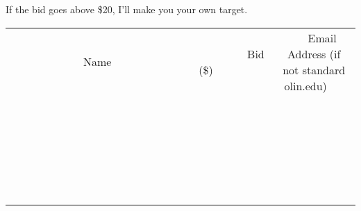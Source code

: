\documentclass[11pt]{article}
\begin{document}
If the bid goes above \$20, I'll make you your own target.
\\[6ex]
\begin{tabular}{c c c}
~~~~~~~~~~~~~Name~~~~~~~~~~~~~ & ~~~~~~~~~Bid (\$)~~~~~~~~~  & ~~~Email Address (if not standard olin.edu)~~~\\
 & & \\
\hline
 & & \\
\hline
 & & \\
\hline
 & & \\
\hline
 & & \\
\hline
 & & \\
\hline
 & & \\
\hline
 & & \\
\hline
 & & \\
\hline
 & & \\
\hline
 & & \\
\hline
 & & \\
\hline
 & & \\
\hline
 & & \\
\hline
 & & \\
\hline
 & & \\
\hline
 & & \\
\hline
 & & \\
\hline
 & & \\
\hline
 & & \\
\hline
 & & \\
\hline
 & & \\
\hline
 & & \\
\hline
 & & \\
\hline
 & & \\
\hline
 & & \\
\hline
\end{tabular}
\newpage
\end{document}
